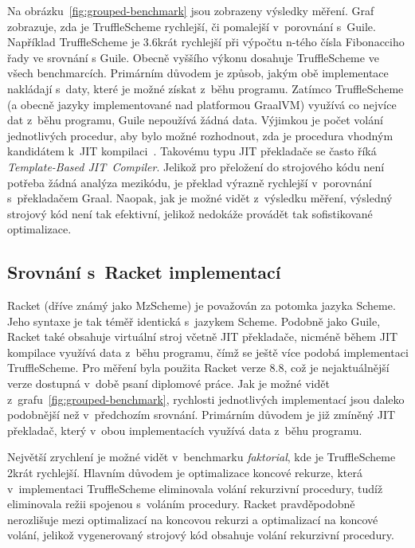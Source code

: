 \documentclass[
  master,
  biblatex,
  figures=true,
  theorems,
  sourcecodes,
  glossaries,
  index
]{kidiplom}
\begin{document}
Na obrázku~\ref{fig:grouped-benchmark} jsou zobrazeny výsledky měření. Graf zobrazuje, zda je TruffleScheme rychlejší, či pomalejší v~porovnání s~Guile. Například TruffleScheme je 3.6krát rychlejší při výpočtu n-tého čísla Fibonacciho řady ve srovnání s Guile. Obecně vyššího výkonu dosahuje TruffleScheme ve všech benchmarcích. Primárním důvodem je způsob, jakým obě implementace nakládají s~daty, které je možné získat z~běhu programu. Zatímco TruffleScheme (a obecně jazyky implementované nad platformou GraalVM) využívá co nejvíce dat z~běhu programu, Guile nepoužívá žádná data. Výjimkou je počet volání jednotlivých procedur, aby bylo možné rozhodnout, zda je procedura vhodným kandidátem k~JIT kompilaci~\cite{guile3-jit}. Takovému typu JIT překladače se často říká \textit{Template-Based JIT~Compiler}. Jelikož pro přeložení do strojového kódu není potřeba žádná analýza mezikódu, je překlad výrazně rychlejší v~porovnání s~překladačem Graal. Naopak, jak je možné vidět z~výsledku měření, výsledný strojový kód není tak efektivní, jelikož nedokáže provádět tak sofistikované optimalizace. 


\subsection{Srovnání s~Racket implementací}
Racket (dříve známý jako MzScheme) je považován za potomka jazyka Scheme. Jeho syntaxe je tak téměř identická s~jazykem Scheme. Podobně jako Guile, Racket také obsahuje virtuální stroj včetně JIT překladače, nicméně během JIT kompilace využívá data z~běhu programu, čímž se ještě více podobá implementaci TruffleScheme. Pro měření byla použita Racket verze 8.8, což je nejaktuálnější verze dostupná v~době psaní diplomové práce. Jak je možné vidět z~grafu~\ref{fig:grouped-benchmark}, rychlosti jednotlivých implementací jsou daleko podobnější než v~předchozím srovnání. Primárním důvodem je již zmíněný JIT překladač, který v~obou implementacích využívá data z~běhu programu.  


Největší zrychlení je možné vidět v~benchmarku \textit{faktorial}, kde je TruffleScheme 2krát rychlejší. Hlavním důvodem je optimalizace koncové rekurze, která v~implementaci TruffleScheme eliminovala volání rekurzivní procedury, tudíž eliminovala režii spojenou s~voláním procedury. Racket pravděpodobně nerozlišuje mezi optimalizací na koncovou rekurzi a optimalizací na koncové volání, jelikož vygenerovaný strojový kód obsahuje volání rekurzivní procedury. 
\end{document}
